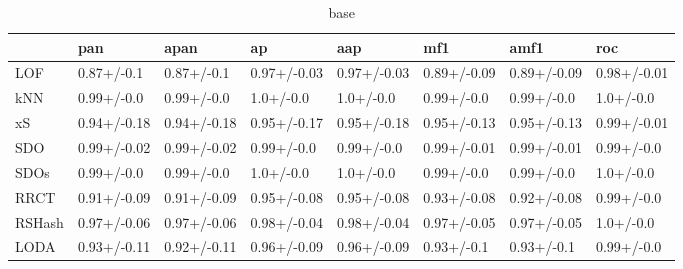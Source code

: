 \begin{table}
\centering
\caption{base}
\begin{tabular}{llllllll}
\toprule
{} &          pan &         apan &           ap &          aap &          mf1 &         amf1 &          roc \\
\midrule
LOF    &   0.87+/-0.1 &   0.87+/-0.1 &  0.97+/-0.03 &  0.97+/-0.03 &  0.89+/-0.09 &  0.89+/-0.09 &  0.98+/-0.01 \\
kNN    &   0.99+/-0.0 &   0.99+/-0.0 &    1.0+/-0.0 &    1.0+/-0.0 &   0.99+/-0.0 &   0.99+/-0.0 &    1.0+/-0.0 \\
xS     &  0.94+/-0.18 &  0.94+/-0.18 &  0.95+/-0.17 &  0.95+/-0.18 &  0.95+/-0.13 &  0.95+/-0.13 &  0.99+/-0.01 \\
SDO    &  0.99+/-0.02 &  0.99+/-0.02 &   0.99+/-0.0 &   0.99+/-0.0 &  0.99+/-0.01 &  0.99+/-0.01 &   0.99+/-0.0 \\
SDOs   &   0.99+/-0.0 &   0.99+/-0.0 &    1.0+/-0.0 &    1.0+/-0.0 &   0.99+/-0.0 &   0.99+/-0.0 &    1.0+/-0.0 \\
RRCT   &  0.91+/-0.09 &  0.91+/-0.09 &  0.95+/-0.08 &  0.95+/-0.08 &  0.93+/-0.08 &  0.92+/-0.08 &   0.99+/-0.0 \\
RSHash &  0.97+/-0.06 &  0.97+/-0.06 &  0.98+/-0.04 &  0.98+/-0.04 &  0.97+/-0.05 &  0.97+/-0.05 &    1.0+/-0.0 \\
LODA   &  0.93+/-0.11 &  0.92+/-0.11 &  0.96+/-0.09 &  0.96+/-0.09 &   0.93+/-0.1 &   0.93+/-0.1 &   0.99+/-0.0 \\
\bottomrule
\end{tabular}
\end{table}
